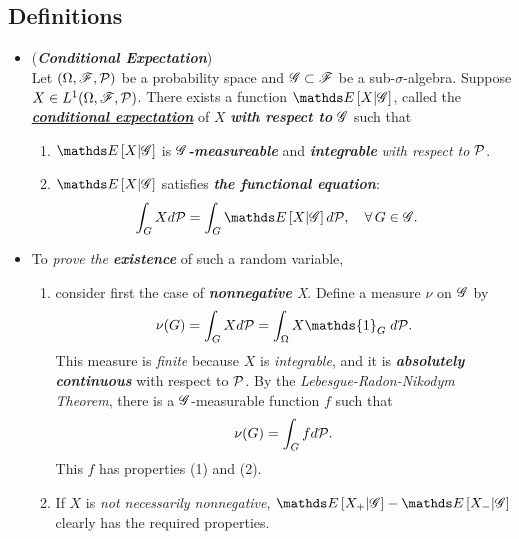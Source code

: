 \documentclass[11pt]{article}
\begin{document}
\subsection{Definitions}
\begin{itemize}
\item \begin{definition} (\emph{\textbf{Conditional Expectation}}) \citep{resnick2013probability}\\
Let $(\Omega, {\mathscr F}, {\mathcal P})$ be a probability space and ${\mathscr G} \subset {\mathscr F}$ be a sub-$\sigma$-algebra. Suppose $X\in  L^{1}(\Omega, {\mathscr F}, {\mathcal P})$. There exists a function $\E{}{X| \srG}$, called the \underline{\emph{\textbf{conditional expectation}}} of $X$ \emph{\textbf{with respect to}} ${\mathscr G}$ such that
\begin{enumerate}
\item $\E{}{X| \srG}$ is \emph{\textbf{${\mathscr G}$-measureable}} and \emph{\textbf{integrable}} \emph{with respect to} ${\mathcal P}$. 

\item $\E{}{X| \srG}$ satisfies \emph{\textbf{the functional equation}}: 
\begin{align*}
\int_{G} X d\cP &= \int_{G} \E{}{X| \srG} d\cP, \quad \forall\, G \in \srG.
\end{align*}
\end{enumerate}
\end{definition}

\item \begin{remark}
To \emph{prove the \textbf{existence}} of such a random variable, 
\begin{enumerate}
\item consider first the case of
\emph{\textbf{nonnegative} X}. Define a measure $\nu$ on ${\mathscr G}$ by 
\begin{align*}
\nu(G) = \int_{G} X d\cP = \int_{\Omega} X \mathds{1}_{G}\; d\cP.
\end{align*}
This measure is \emph{finite} because $X$ is \emph{integrable}, and it is \emph{\textbf{absolutely continuous}} with respect to ${\mathcal P}$. By the \emph{Lebesgue-Radon-Nikodym Theorem},  there is a ${\mathscr G}$-measurable function $f$
such that 
\begin{align*}
\nu(G) = \int_{G} f d{\mathcal P}.
\end{align*}
This $f$ has properties (1) and (2). 
\item If $X$ is \emph{not necessarily nonnegative}, $\E{}{X_{+}| \srG} - \E{}{X_{-}| \srG}$ clearly has the required properties.
\end{enumerate}
\end{remark}


\end{itemize}
\end{document}
